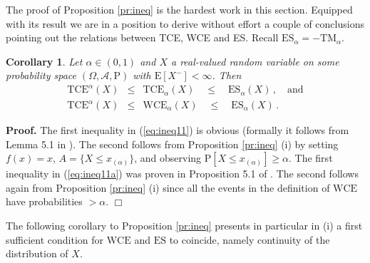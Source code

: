 \documentclass[11pt,a4paper,leqno]{article}
\newtheorem{corollary}[theorem]{Corollary}
\begin{document}
The proof of Proposition \ref{pr:ineq} is the hardest work in this section.
Equipped with its result we are in a position to derive without effort
a couple of conclusions pointing out the relations between TCE, WCE and ES.
Recall $\mathrm{ES}_\alpha = - \mathrm{TM}_\alpha$.

\begin{corollary}
  \label{co:ineq1}
Let $\alpha \in (0,1)$ and $X$ a real-valued random variable on some
probability space $(\Omega, \mathcal{A}, \mathrm{P})$ with $\mathrm{E}[X^-] < \infty$.
Then
\begin{eqnarray}
\mathrm{TCE}^\alpha(X) & \le &  \mathrm{TCE}_\alpha(X) \quad \le \quad
\mathrm{ES}_\alpha(X)\,, \quad \mbox{and}
  \label{eq:ineq11}\\
\mathrm{TCE}^\alpha(X) & \le & \mathrm{WCE}_\alpha(X) \quad \le \quad
\mathrm{ES}_\alpha(X)\,.
\label{eq:ineq11a}
\end{eqnarray}
\end{corollary}
%
\textbf{Proof.} The first inequality in (\ref{eq:ineq11}) is obvious (formally it
follows from Lemma 5.1 in \cite{T00}). The second
follows from Proposition \ref{pr:ineq} (i) by 
setting $f(x) = x$, $A = \{X \le x_{(\alpha)}\}$, and observing 
$\mathrm{P}[X \le x_{(\alpha)}]\ge \alpha$.
The first inequality in (\ref{eq:ineq11a}) was proven in Proposition 5.1 of \cite{ADEH99}.
The second follows again from Proposition \ref{pr:ineq} (i) since all the
events
in the definition of $\mathrm{WCE}$ have probabilities $> \alpha$.
\hfill $\Box$ 

The following corollary to Proposition \ref{pr:ineq} presents in particular in (i)
a first sufficient condition for $\mathrm{WCE}$ and $\mathrm{ES}$ to coincide,
namely continuity of the distribution of $X$.
\end{document}
